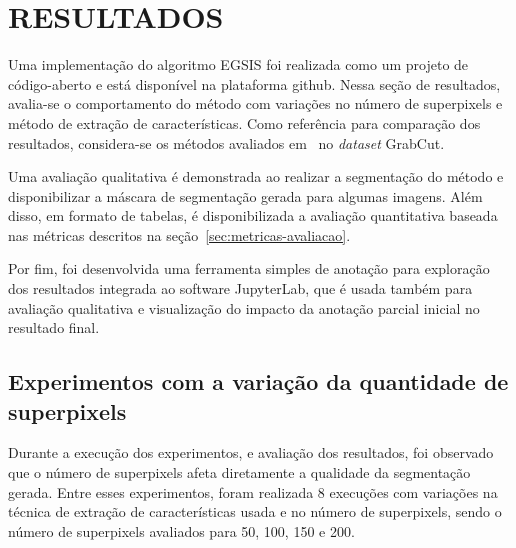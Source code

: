 \chapter{RESULTADOS}\label{chap:resultados}

Uma implementação do algoritmo EGSIS foi realizada como um projeto de
código-aberto e está disponível na plataforma
github\footnotemark. Nessa seção de resultados, avalia-se o
comportamento do método com variações no número de superpixels e
método de extração de características. Como referência para comparação
dos resultados, considera-se os métodos avaliados
em~\cite{wang2023review} no \textit{dataset} GrabCut.


Uma avaliação qualitativa é demonstrada ao realizar a segmentação do
método e disponibilizar a máscara de segmentação gerada para algumas
imagens. Além disso, em formato de tabelas, é disponibilizada a
avaliação quantitativa baseada nas métricas descritos na
seção~\ref{sec:metricas-avaliacao}.

Por fim, foi desenvolvida uma ferramenta simples de anotação para
exploração dos resultados integrada ao software
JupyterLab\footnotemark, que é usada também para avaliação qualitativa
e visualização do impacto da anotação parcial inicial no resultado
final.


\section{Experimentos com a variação da quantidade de superpixels}\label{sec:variacao-superpixels}

Durante a execução dos experimentos, e avaliação dos resultados, foi
observado que o número de superpixels afeta diretamente a qualidade da
segmentação gerada. Entre esses experimentos, foram realizada 8
execuções com variações na técnica de extração de características
usada e no número de superpixels, sendo o número de superpixels
avaliados para 50, 100, 150 e 200.

